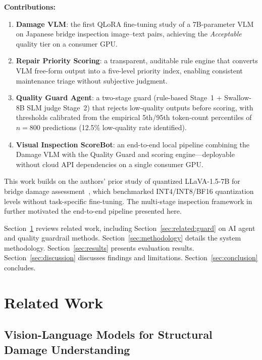 \documentclass[twocolumn]{article}
\begin{document}
\textbf{Contributions:}
\begin{enumerate}[leftmargin=*,itemsep=1pt]
  \item \textbf{Damage VLM}: the first QLoRA fine-tuning study of a
        7B-parameter VLM on Japanese bridge inspection image--text pairs,
        achieving the \textit{Acceptable} quality tier on a consumer GPU.
  \item \textbf{Repair Priority Scoring}: a transparent, auditable rule engine
        that converts VLM free-form output into a five-level priority index,
        enabling consistent maintenance triage without subjective judgment.
  \item \textbf{Quality Guard Agent}: a two-stage guard (rule-based Stage~1
        + Swallow-8B SLM judge Stage~2) that rejects low-quality outputs
        before scoring, with thresholds calibrated from the empirical
        5th/95th token-count percentiles of $n=800$ predictions (12.5\%
        low-quality rate identified).
  \item \textbf{Visual Inspection ScoreBot}: an end-to-end local pipeline
        combining the Damage VLM with the Quality Guard and scoring engine---deployable without
        cloud API dependencies on a single consumer GPU.
\end{enumerate}

This work builds on the authors' prior study of quantized LLaVA-1.5-7B for
bridge damage assessment~\cite{yasuno2026quantized}, which benchmarked
INT4/INT8/BF16 quantization levels without task-specific fine-tuning.
The multi-stage inspection framework in~\cite{yasuno2026multistage} further
motivated the end-to-end pipeline presented here.

Section~\ref{sec:related} reviews related work, including
Section~\ref{sec:related:guard} on AI agent and quality guardrail methods.
Section~\ref{sec:methodology} details the system methodology.
Section~\ref{sec:results} presents evaluation results.
Section~\ref{sec:discussion} discusses findings and limitations.
Section~\ref{sec:conclusion} concludes.

\section{Related Work}
\label{sec:related}

\subsection{Vision-Language Models for Structural Damage Understanding}
\end{document}
